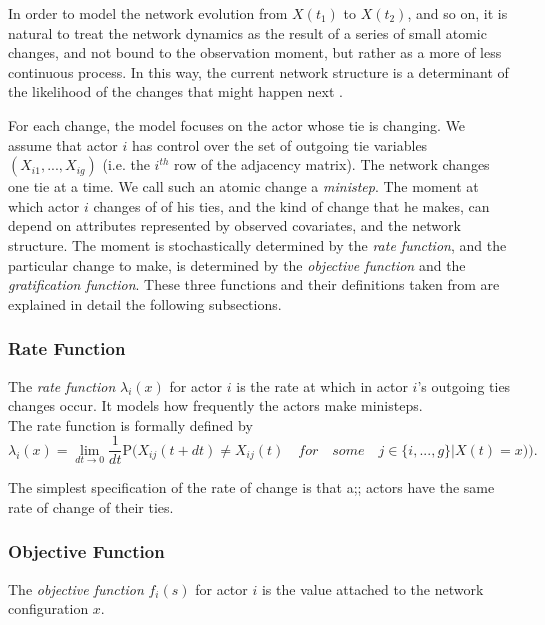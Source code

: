 \documentclass{report}
\begin{document}
In order to model the network evolution from $X(t_1)$ to $X(t_2)$, and so on, it is natural to treat the network dynamics as the result of a series of small atomic changes, and not bound to the observation moment, but rather as a more of less continuous process. In this way, the current network structure is a determinant of the likelihood of the changes that might happen next \cite{Coleman1964}. 

For each change, the model focuses on the actor whose tie is changing. We assume that actor $i$ has control over the set of outgoing  tie variables $(X_{i1}, ..., X_{ig})$ (i.e. the $i^{th}$ row of the adjacency matrix). The network changes one tie at a time. We call such an atomic change  a \textit{ministep}. The moment at which actor $i$ changes of of his ties, and the kind of change that he makes, can depend on attributes represented by observed covariates, and the network structure. The moment is stochastically determined by the \textit{rate function}, and the particular change to make, is determined by the \textit{objective function} and the \textit{gratification function}. These three functions and their definitions taken from \cite{Snijders2004} are explained in detail the following subsections.

\subsubsection{Rate Function}

The \textit{rate function} $\lambda_i(x)$ for actor $i$ is the rate at which in actor $i$'s outgoing ties changes occur. It models how frequently the actors make ministeps.\\
The rate function is formally defined by
\begin{equation}
\lambda_i(x) = \lim_{dt \to 0} \frac{1}{dt} \mathrm {P} \big({X_{ij}(t + dt) \neq X_{ij}(t) \quad for \quad some \quad j \in \{i, ..., g\} | X(t) = x)}\big).
\end{equation}

The simplest specification of the rate of change is that a;; actors have the same rate of change of their ties. 

\subsubsection{Objective Function}

The \textit{objective function} $f_i(s)$ for actor $i$ is the value attached to the network configuration $x$. 
\end{document}
